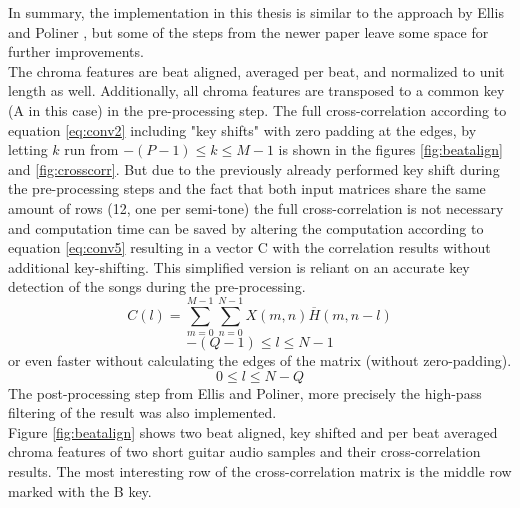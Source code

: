 In summary, the implementation in this thesis is similar to the approach by Ellis and Poliner \cite{chroma3}, but some of the steps from the newer paper \cite{cover802} leave some space for further improvements.\\ The chroma features are beat aligned, averaged per beat, and normalized to unit length as well. Additionally, all chroma features are transposed to a common key (A in this case) in the pre-processing step. The full cross-correlation according to equation \ref{eq:conv2} including "key shifts" with zero padding at the edges, by letting $k$ run from $-(P - 1) \leq k \leq M - 1$ is shown in the figures \ref{fig:beatalign} and \ref{fig:crosscorr}. But due to the previously already performed key shift during the pre-processing steps and the fact that both input matrices share the same amount of rows (12, one per semi-tone) the full cross-correlation is not necessary and computation time can be saved by altering the computation according to equation \ref{eq:conv5} resulting in a vector C with the correlation results without additional key-shifting. This simplified version is reliant on an accurate key detection of the songs during the pre-processing.
\begin{equation} \label{eq:conv5}
C(l) = \sum_{m = 0}^{M - 1}{\sum_{n = 0}^{N - 1}{X(m, n)\overline{H}(m, n - l)}}
\end{equation}
\begin{equation} \label{eq:conv6}
-(Q - 1) \leq l \leq N - 1
\end{equation}
or even faster without calculating the edges of the matrix (without zero-padding).
\begin{equation} \label{eq:conv7}
0 \leq l \leq N - Q
\end{equation}
The post-processing step from Ellis and Poliner, more precisely the high-pass filtering of the result was also implemented.\\
Figure \ref{fig:beatalign} shows two beat aligned, key shifted and per beat averaged chroma features of two short guitar audio samples and their cross-correlation results. The most interesting row of the cross-correlation matrix is the middle row marked with the B key. %
